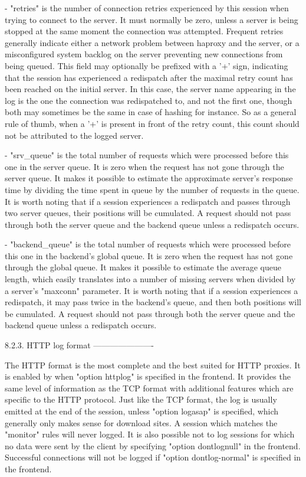   - "retries" is the number of connection retries experienced by this session
    when trying to connect to the server. It must normally be zero, unless a
    server is being stopped at the same moment the connection was attempted.
    Frequent retries generally indicate either a network problem between
    haproxy and the server, or a misconfigured system backlog on the server
    preventing new connections from being queued. This field may optionally be
    prefixed with a '+' sign, indicating that the session has experienced a
    redispatch after the maximal retry count has been reached on the initial
    server. In this case, the server name appearing in the log is the one the
    connection was redispatched to, and not the first one, though both may
    sometimes be the same in case of hashing for instance. So as a general rule
    of thumb, when a '+' is present in front of the retry count, this count
    should not be attributed to the logged server.

  - "srv_queue" is the total number of requests which were processed before
    this one in the server queue. It is zero when the request has not gone
    through the server queue. It makes it possible to estimate the approximate
    server's response time by dividing the time spent in queue by the number of
    requests in the queue. It is worth noting that if a session experiences a
    redispatch and passes through two server queues, their positions will be
    cumulated. A request should not pass through both the server queue and the
    backend queue unless a redispatch occurs.

  - "backend_queue" is the total number of requests which were processed before
    this one in the backend's global queue. It is zero when the request has not
    gone through the global queue. It makes it possible to estimate the average
    queue length, which easily translates into a number of missing servers when
    divided by a server's "maxconn" parameter. It is worth noting that if a
    session experiences a redispatch, it may pass twice in the backend's queue,
    and then both positions will be cumulated. A request should not pass
    through both the server queue and the backend queue unless a redispatch
    occurs.


8.2.3. HTTP log format
----------------------

The HTTP format is the most complete and the best suited for HTTP proxies. It
is enabled by when "option httplog" is specified in the frontend. It provides
the same level of information as the TCP format with additional features which
are specific to the HTTP protocol. Just like the TCP format, the log is usually
emitted at the end of the session, unless "option logasap" is specified, which
generally only makes sense for download sites. A session which matches the
"monitor" rules will never logged. It is also possible not to log sessions for
which no data were sent by the client by specifying "option dontlognull" in the
frontend. Successful connections will not be logged if "option dontlog-normal"
is specified in the frontend.

